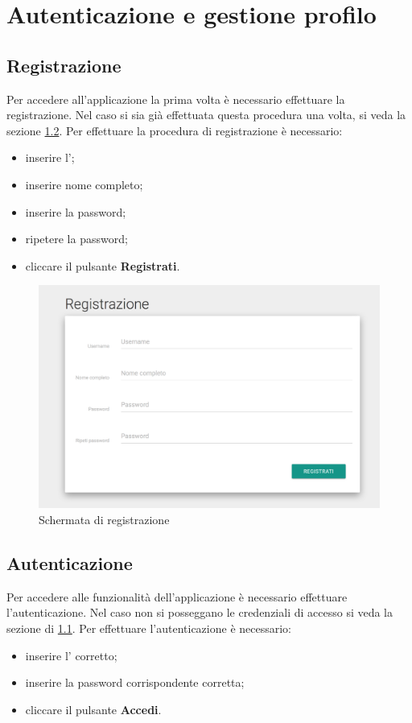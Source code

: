 \documentclass[12pt,a4paper]{article}
\begin{document}
	\newpage
	\section{Autenticazione e gestione profilo}
	\subsection{Registrazione}\label{registrazione}
	Per accedere all'applicazione la prima volta è necessario effettuare la registrazione. Nel caso si sia già effettuata questa procedura una volta, si veda la sezione \ref{autenticazione}.
	Per effettuare la procedura di registrazione è necessario:
	\begin{itemize}
		\item inserire l';
		\item inserire nome completo;
		\item inserire la password;
		\item ripetere la password;
		\item cliccare il pulsante \textbf{Registrati}. 
	\end{itemize}

\begin{figure}[h]
		
\centering
\includegraphics[width=\linewidth]{../img/screenshot/signup.png}
\caption{Schermata di registrazione}
\label{Schermata di registrazione}
\end{figure}


	\subsection{Autenticazione}\label{autenticazione}
	Per accedere alle funzionalità dell'applicazione è necessario effettuare l'autenticazione. Nel caso non si posseggano le credenziali di accesso si veda la sezione di \ref{registrazione}.
	Per effettuare l'autenticazione è necessario:
	\begin{itemize}
		\item inserire l' corretto;
		\item inserire la password corrispondente corretta;
		\item cliccare il pulsante \textbf{Accedi}.
	\end{itemize}
	
\end{document}
